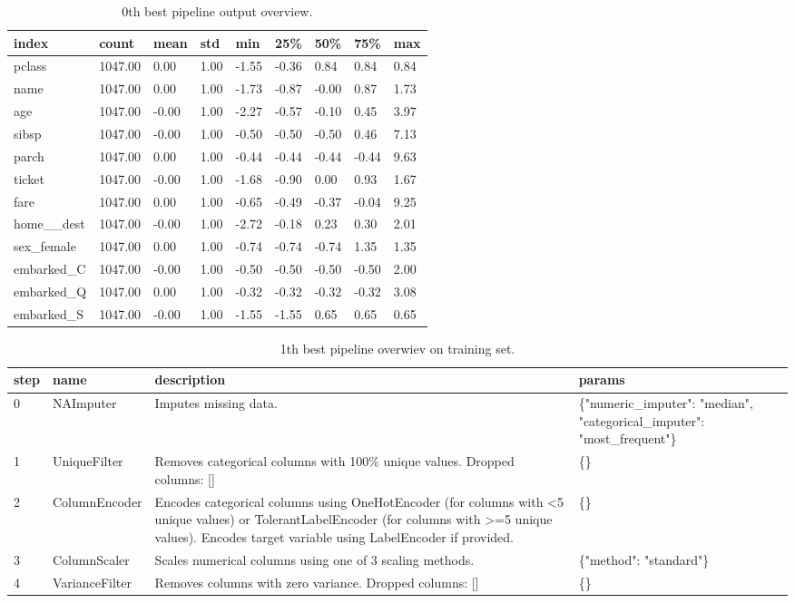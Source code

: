 \documentclass{article}%
\begin{document}
%


\begin{table}[H]%
\begin{center}%
\begin{tabular}{l l l l l l l l l}%
\hline%
\textbf{index}&\textbf{count}&\textbf{mean}&\textbf{std}&\textbf{min}&\textbf{25\%}&\textbf{50\%}&\textbf{75\%}&\textbf{max}\\%
\hline%
pclass&1047.00&0.00&1.00&{-}1.55&{-}0.36&0.84&0.84&0.84\\%
name&1047.00&0.00&1.00&{-}1.73&{-}0.87&{-}0.00&0.87&1.73\\%
age&1047.00&{-}0.00&1.00&{-}2.27&{-}0.57&{-}0.10&0.45&3.97\\%
sibsp&1047.00&{-}0.00&1.00&{-}0.50&{-}0.50&{-}0.50&0.46&7.13\\%
parch&1047.00&0.00&1.00&{-}0.44&{-}0.44&{-}0.44&{-}0.44&9.63\\%
ticket&1047.00&{-}0.00&1.00&{-}1.68&{-}0.90&0.00&0.93&1.67\\%
fare&1047.00&0.00&1.00&{-}0.65&{-}0.49&{-}0.37&{-}0.04&9.25\\%
home\_\_dest&1047.00&{-}0.00&1.00&{-}2.72&{-}0.18&0.23&0.30&2.01\\%
sex\_female&1047.00&0.00&1.00&{-}0.74&{-}0.74&{-}0.74&1.35&1.35\\%
embarked\_C&1047.00&{-}0.00&1.00&{-}0.50&{-}0.50&{-}0.50&{-}0.50&2.00\\%
embarked\_Q&1047.00&0.00&1.00&{-}0.32&{-}0.32&{-}0.32&{-}0.32&3.08\\%
embarked\_S&1047.00&{-}0.00&1.00&{-}1.55&{-}1.55&0.65&0.65&0.65\\%
\hline%
\end{tabular}%
\end{center}%
\caption{0th best pipeline output overview.}%
\end{table}

%


\begin{table}[H]%
\begin{center}%
\begin{tabular}{p{10mm} p{30mm} p{60mm} p{60mm}}%
\hline%
\textbf{step}&\textbf{name}&\textbf{description}&\textbf{params}\\%
\hline%
0&NAImputer&Imputes missing data.&\{"numeric\_imputer": "median", "categorical\_imputer": "most\_frequent"\}\\%
1&UniqueFilter&Removes categorical columns with 100\% unique values. Dropped columns: {[}{]}&\{\}\\%
2&ColumnEncoder&Encodes categorical columns using OneHotEncoder (for columns with <5 unique values) or TolerantLabelEncoder (for columns with >=5 unique values). Encodes target variable using LabelEncoder if provided.&\{\}\\%
3&ColumnScaler&Scales numerical columns using one of 3 scaling methods.&\{"method": "standard"\}\\%
4&VarianceFilter&Removes columns with zero variance. Dropped columns: {[}{]}&\{\}\\%
\hline%
\end{tabular}%
\end{center}%
\caption{1th best pipeline overwiev on training set.}%
\end{table}
\end{document}
